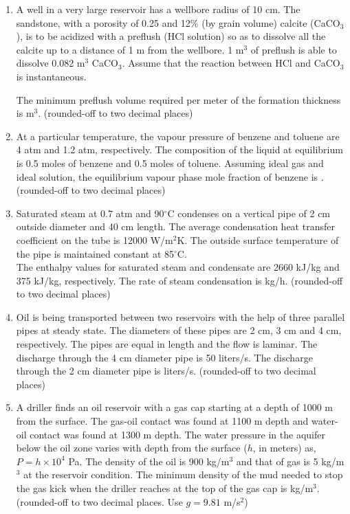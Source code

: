 \documentclass[12pt,a4paper]{article}
\begin{document}
\begin{enumerate}
\item A well in a very large reservoir has a wellbore radius of 10 cm. The sandstone, with a porosity of 0.25 and 12\% (by grain volume) calcite (CaCO$_3$), is to be acidized with a preflush (HCl solution) so as to dissolve all the calcite up to a distance of 1 m from the wellbore. 1 m$^3$ of preflush is able to dissolve 0.082 m$^3$ CaCO$_3$. Assume that the reaction between HCl and CaCO$_3$ is instantaneous. 

The minimum preflush volume required per meter of the formation thickness is \underline{\hspace{2cm}} m$^3$. (rounded-off to two decimal places) \hfill{}


\item At a particular temperature, the vapour pressure of benzene and toluene are 4 atm and 1.2 atm, respectively. The composition of the liquid at equilibrium is 0.5 moles of benzene and 0.5 moles of toluene. Assuming ideal gas and ideal solution, the equilibrium vapour phase mole fraction of benzene is \underline{\hspace{2cm}}. (rounded-off to two decimal places) \hfill{}
\pagebreak

\item Saturated steam at 0.7 atm and 90$^\circ$C condenses on a vertical pipe of 2 cm outside diameter and 40 cm length. The average condensation heat transfer coefficient on the tube is 12000 W/m$^2$K. The outside surface temperature of the pipe is maintained constant at 85$^\circ$C. \\ 
The enthalpy values for saturated steam and condensate are 2660 kJ/kg and 375 kJ/kg, respectively. The rate of steam condensation is \underline{\hspace{2cm}} kg/h. (rounded-off to two decimal places) \hfill{}



\item Oil is being transported between two reservoirs with the help of three parallel pipes at steady state. The diameters of these pipes are 2 cm, 3 cm and 4 cm, respectively. The pipes are equal in length and the flow is laminar. The discharge through the 4 cm diameter pipe is 50 liters/s. The discharge through the 2 cm diameter pipe is \underline{\hspace{2cm}} liters/s. (rounded-off to two decimal places) \hfill{}
\item A driller finds an oil reservoir with a gas cap starting at a depth of 1000 m from the surface. The gas-oil contact was found at 1100 m depth and water-oil contact was found at 1300 m depth. The water pressure in the aquifer below the oil zone varies with depth from the surface ($h$, in meters) as, $P = h \times 10^4$ Pa. The density of the oil is 900 kg/m$^3$ and that of gas is 5 kg/m$^3$ at the reservoir condition. The minimum density of the mud needed to stop the gas kick when the driller reaches at the top of the gas cap is \underline{\hspace{2cm}} kg/m$^3$. (rounded-off to two decimal places. Use $g = 9.81$ m/s$^2$) \hfill{}



\end{enumerate}
\end{document}
